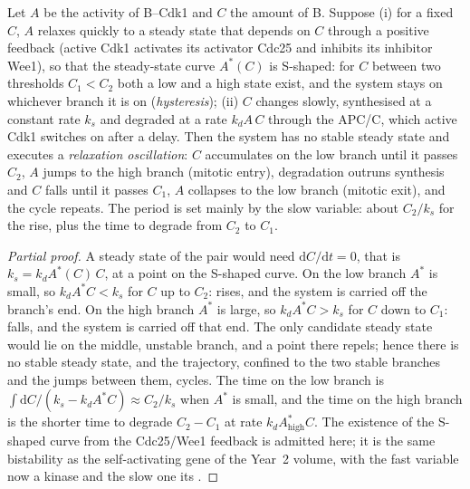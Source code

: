 \begin{theorem}\label{thm:b3:cell-cycle-apoptosis:oscillator}
Let $A$ be the activity of  B--Cdk1 and $C$ the amount of 
B. Suppose (i) for a fixed $C$, $A$ relaxes quickly to a steady state
that depends on $C$ through a positive feedback (active Cdk1 activates
its activator Cdc25 and inhibits its inhibitor Wee1), so that the
steady-state curve $A^{*}(C)$ is S-shaped: for $C$ between two
thresholds $C_{1} < C_{2}$ both a low and a high state exist, and the
system stays on whichever branch it is on (\emph{hysteresis}); (ii) $C$
changes slowly, synthesised at a constant rate $k_{s}$ and degraded at
a rate $k_{d}A\,C$ through the APC/C, which active Cdk1 switches on
after a delay. Then the system has no stable steady state and executes
a \emph{relaxation oscillation}: $C$ accumulates on the low branch until
it passes $C_{2}$, $A$ jumps to the high branch (mitotic entry),
degradation outruns synthesis and $C$ falls until it passes $C_{1}$, $A$
collapses to the low branch (mitotic exit), and the cycle repeats. The
period is set mainly by the slow variable: about $C_{2}/k_{s}$ for the
rise, plus the time to degrade from $C_{2}$ to $C_{1}$.
\end{theorem}
\begin{proof}[Partial proof]
A steady state of the pair would need $\mathrm{d}C/\mathrm{d}t = 0$,
that is $k_{s} = k_{d}A^{*}(C)\,C$, at a point on the S-shaped curve.
On the low branch $A^{*}$ is small, so $k_{d}A^{*}C < k_{s}$ for $C$ up
to $C_{2}$:  rises, and the system is carried off the branch's
end. On the high branch $A^{*}$ is large, so $k_{d}A^{*}C > k_{s}$ for
$C$ down to $C_{1}$:  falls, and the system is carried off that
end. The only candidate steady state would lie on the middle,
unstable branch, and a point there repels; hence there is no stable
steady state, and the trajectory, confined to the two stable branches
and the jumps between them, cycles. The time on the low branch is
$\int \mathrm{d}C/(k_{s} - k_{d}A^{*}C) \approx C_{2}/k_{s}$ when
$A^{*}$ is small, and the time on the high branch is the shorter time
to degrade $C_{2} - C_{1}$ at rate $k_{d}A^{*}_{\text{high}}C$. The
existence of the S-shaped curve from the Cdc25/Wee1 feedback is
admitted here; it is the same bistability as the self-activating gene
of the Year~2 volume, with the fast variable now a kinase and the slow
one its .
\end{proof}

